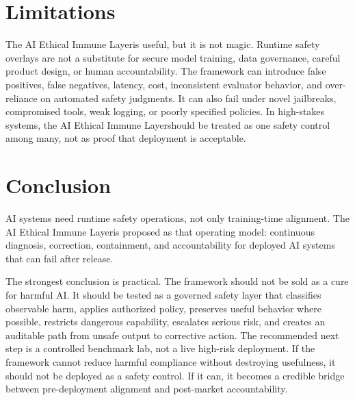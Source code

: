 \documentclass[11pt]{article}
\newcommand{\AEIL}{AI Ethical Immune Layer}
\begin{document}
\section{Limitations}

The \AEIL is useful, but it is not magic. Runtime safety overlays are not a substitute for secure model training, data governance, careful product design, or human accountability. The framework can introduce false positives, false negatives, latency, cost, inconsistent evaluator behavior, and over-reliance on automated safety judgments. It can also fail under novel jailbreaks, compromised tools, weak logging, or poorly specified policies. In high-stakes systems, the \AEIL should be treated as one safety control among many, not as proof that deployment is acceptable.

\section{Conclusion}

AI systems need runtime safety operations, not only training-time alignment. The \AEIL is proposed as that operating model: continuous diagnosis, correction, containment, and accountability for deployed AI systems that can fail after release.

The strongest conclusion is practical. The framework should not be sold as a cure for harmful AI. It should be tested as a governed safety layer that classifies observable harm, applies authorized policy, preserves useful behavior where possible, restricts dangerous capability, escalates serious risk, and creates an auditable path from unsafe output to corrective action. The recommended next step is a controlled benchmark lab, not a live high-risk deployment. If the framework cannot reduce harmful compliance without destroying usefulness, it should not be deployed as a safety control. If it can, it becomes a credible bridge between pre-deployment alignment and post-market accountability.



\end{document}
